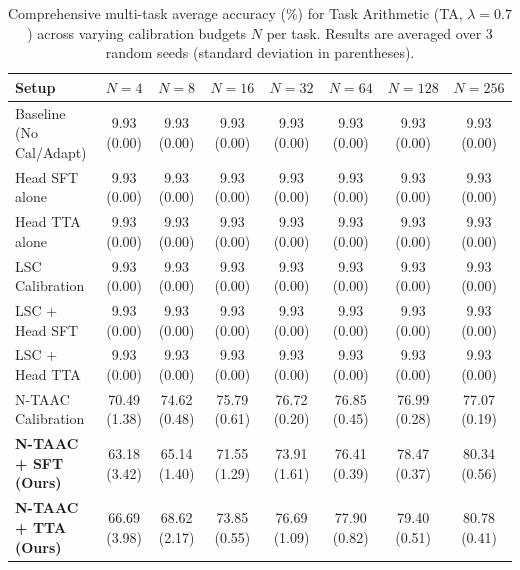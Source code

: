 \documentclass{article}
\theoremstyle{plain}
\theoremstyle{definition}
\theoremstyle{remark}
\begin{document}
\begin{table}[ht]
\centering
\caption{Comprehensive multi-task average accuracy (\%) for Task Arithmetic (TA, $\lambda=0.7$) across varying calibration budgets $N$ per task. Results are averaged over 3 random seeds (standard deviation in parentheses).}
\label{tab:appendix_ta_07}
\vskip 0.15in
\begin{sc}
\begin{scriptsize}
\setlength{\tabcolsep}{3pt}
\begin{tabular}{lccccccc}
\toprule
Setup & $N=4$ & $N=8$ & $N=16$ & $N=32$ & $N=64$ & $N=128$ & $N=256$ \\
\midrule
Baseline (No Cal/Adapt) & 9.93 (0.00) & 9.93 (0.00) & 9.93 (0.00) & 9.93 (0.00) & 9.93 (0.00) & 9.93 (0.00) & 9.93 (0.00) \\
Head SFT alone & 9.93 (0.00) & 9.93 (0.00) & 9.93 (0.00) & 9.93 (0.00) & 9.93 (0.00) & 9.93 (0.00) & 9.93 (0.00) \\
Head TTA alone & 9.93 (0.00) & 9.93 (0.00) & 9.93 (0.00) & 9.93 (0.00) & 9.93 (0.00) & 9.93 (0.00) & 9.93 (0.00) \\
LSC Calibration & 9.93 (0.00) & 9.93 (0.00) & 9.93 (0.00) & 9.93 (0.00) & 9.93 (0.00) & 9.93 (0.00) & 9.93 (0.00) \\
LSC + Head SFT & 9.93 (0.00) & 9.93 (0.00) & 9.93 (0.00) & 9.93 (0.00) & 9.93 (0.00) & 9.93 (0.00) & 9.93 (0.00) \\
LSC + Head TTA & 9.93 (0.00) & 9.93 (0.00) & 9.93 (0.00) & 9.93 (0.00) & 9.93 (0.00) & 9.93 (0.00) & 9.93 (0.00) \\
N-TAAC Calibration & 70.49 (1.38) & 74.62 (0.48) & 75.79 (0.61) & 76.72 (0.20) & 76.85 (0.45) & 76.99 (0.28) & 77.07 (0.19) \\
\textbf{N-TAAC + SFT (Ours)} & 63.18 (3.42) & 65.14 (1.40) & 71.55 (1.29) & 73.91 (1.61) & 76.41 (0.39) & 78.47 (0.37) & 80.34 (0.56) \\
\textbf{N-TAAC + TTA (Ours)} & 66.69 (3.98) & 68.62 (2.17) & 73.85 (0.55) & 76.69 (1.09) & 77.90 (0.82) & 79.40 (0.51) & 80.78 (0.41) \\
\bottomrule
\end{tabular}
\end{scriptsize}
\end{sc}
\end{table}
\end{document}
